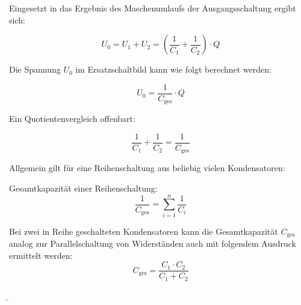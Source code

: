 \begin{frame}
{		Eingesetzt in das Ergebnis des Maschenumlaufs der Ausgangsschaltung ergibt sich:
		
		\begin{equation*}
			U_0 = U_1 + U_2 = \left( \frac{1}{C_1} + \frac{1}{C_2} \right) \cdot Q
		\end{equation*}
		
		Die Spannung $U_0$ im Ersatzschaltbild kann wie folgt berechnet werden:
		
		\begin{equation*}
			U_0 = \frac{1}{C_\mathrm{ges}} \cdot Q
		\end{equation*}
		
		Ein Quotientenvergleich offenbart:
		
		\begin{equation*}
			\frac{1}{C_1} + \frac{1}{C_2} = \frac{1}{C_\mathrm{ges}}
		\end{equation*}
		
		Allgemein gilt für eine Reihenschaltung aus beliebig vielen Kondensatoren:
		
		\begin{Merksatz}{Gesamtkapazität einer Reihenschaltung:}
			\begin{equation}
				\frac{1}{C_\mathrm{ges}} = \sum_{i = 1}^{n} \frac{1}{C_i}
			\end{equation}
		\end{Merksatz}
		
		
		Bei zwei in Reihe geschalteten Kondensatoren kann die Gesamtkapazität $C_\mathrm{ges}$ analog zur 
		Parallelschaltung von Widerständen auch mit folgendem Ausdruck ermittelt werden:\\
		
		\begin{equation*}
			C_\mathrm{ges} = \frac{C_1 \cdot C_2}{C_1 + C_2}
		\end{equation*}
		
		
		
		
		
		
		
		
		
		
		
	}
	
	
	
	\b{
		\begin{columns}
			
			\vspace{-110pt}
			

\end{columns}}
\end{frame}
